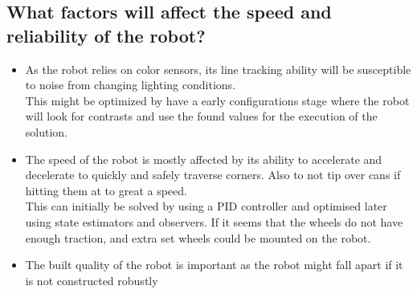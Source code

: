 \documentclass[../../main.tex]{subfiles}
\begin{document}
\subsection{What factors will affect the speed and reliability of the robot?}%
\label{sub:what_factors_will_affect_the_speed_and_reliability_of_the_robot_}

\begin{itemize}
	\item As the robot relies on color sensors, its line tracking ability will be susceptible to
		noise from changing lighting conditions.\\
		This might be optimized by have a early configurations stage where the robot will look for
		contrasts and use the found values for the execution of the solution.
	\item The speed of the robot is mostly affected by its ability to accelerate and decelerate to
		quickly and safely traverse corners. Also to not tip over cans if hitting them at to great a
		speed.\\
		This can initially be solved by using a PID controller and optimised later using state estimators
		and observers. If it seems that the wheels do not have enough traction, and extra set wheels
		could be mounted on the robot.
	\item The built quality of the robot is important as the robot might fall apart if it is not
		constructed robustly
\end{itemize}
\end{document}
